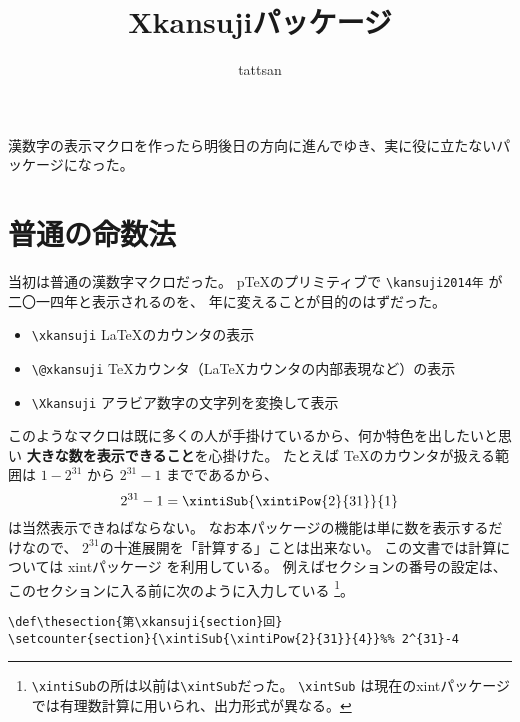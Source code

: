 \documentclass[dvipdfmx]{jsarticle}
\title{\textsf{Xkansujiパッケージ}}
\author{tattsan}
\date{}
\begin{document}
\maketitle
漢数字の表示マクロを作ったら明後日の方向に進んでゆき、実に役に立たないパッケージになった。
\def\thesection{第\xkansuji{section}話}
\section{普通の命数法}
当初は普通の漢数字マクロだった。
p\TeX\space のプリミティブで \verb+\kansuji2014年+ が二〇一四年と表示されるのを、
年に変えることが目的のはずだった。
\begin{screen}
\begin{itemize}
\item \verb+\xkansuji+ \LaTeX のカウンタの表示
\item \verb+\@xkansuji+ \TeX カウンタ（\LaTeX カウンタの内部表現など）の表示
\item \verb+\Xkansuji+ アラビア数字の文字列を変換して表示
\end{itemize}  
\end{screen}
このようなマクロは既に多くの人が手掛けているから、何か特色を出したいと思い
\textbf{大きな数を表示できること}を心掛けた。
たとえば \TeX のカウンタが扱える範囲は $1-2^{31}$ から $2^{31}-1$ までであるから、
\[
2^{31}-1=\xintiSub{\xintiPow{2}{31}}{1}
\]
は当然表示できねばならない。
なお本パッケージの機能は単に数を表示するだけなので、
$2^{31}$の十進展開を「計算する」ことは出来ない。
この文書では計算については \textsf{xintパッケージ} を利用している。
例えばセクションの番号の設定は、このセクションに入る前に次のように入力している
\footnote{%
\texttt{\textbackslash xintiSub}の所は以前は\texttt{\textbackslash xintSub}だった。
\texttt{\textbackslash xintSub}
は現在の\textsf{xintパッケージ}では有理数計算に用いられ、出力形式が異なる。}。
\begin{verbatim}
\def\thesection{第\xkansuji{section}回}
\setcounter{section}{\xintiSub{\xintiPow{2}{31}}{4}}%% 2^{31}-4
\end{verbatim}
\end{document}
